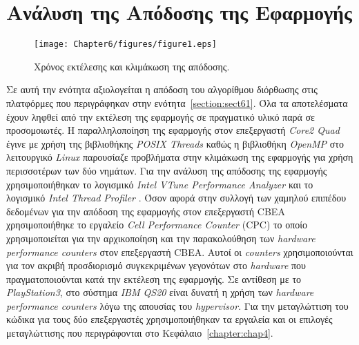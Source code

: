 \section{Ανάλυση της Απόδοσης της Εφαρμογής}
\label{section:sect62}
\begin{figure}
\centering
\texttt{[image: Chapter6/figures/figure1.eps]}
\caption{Χρόνος εκτέλεσης και κλιμάκωση της απόδοσης.}
\label{figure:fig61}
\end{figure}
\indent
Σε αυτή την ενότητα αξιολογείται η απόδοση του αλγορίθμου διόρθωσης στις πλατφόρμες που περιγράφηκαν στην ενότητα~\ref{section:sect61}. Όλα τα αποτελέσματα έχουν ληφθεί από την εκτέλεση της εφαρμογής σε πραγματικό υλικό παρά σε προσομοιωτές.\newline \indent
Η παραλληλοποίηση της εφαρμογής στον επεξεργαστή \textsl{Core2 Quad} έγινε με χρήση της βιβλιοθήκης \textsl{POSIX Threads} καθώς η βιβλιοθήκη \textsl{OpenMP} στο λειτουργικό \textsl{Linux} παρουσίαζε προβλήματα στην κλιμάκωση της εφαρμογής για χρήση περισσοτέρων των δύο νημάτων. Για την ανάλυση της απόδοσης της εφαρμογής χρησιμοποιήθηκαν το λογισμικό \textsl{Intel VTune Performance Analyzer} \cite{intelvtune} και το λογισμικό \textsl{Intel Thread Profiler} \cite{threadprofiler}.\newline \indent
Όσον αφορά στην συλλογή των χαμηλού επιπέδου δεδομένων για την απόδοση της εφαρμογής στον επεξεργαστή \ac{CBEA} χρησιμοποιήθηκε το εργαλείο \textsl{Cell Performance Counter} (CPC) το οποίο χρησιμοποιείται για την αρχικοποίηση και την παρακολούθηση των \textsl{hardware performance counters} στον επεξεργαστή \ac{CBEA}. Αυτοί οι \textsl{counters} χρησιμοποιούνται για τον ακριβή προσδιορισμό συγκεκριμένων γεγονότων στο \textsl{hardware} που πραγματοποιούνται κατά την εκτέλεση της εφαρμογής. Σε αντίθεση με το \textsl{PlayStation3}, στο σύστημα \textsl{IBM QS20} είναι δυνατή η χρήση των \textsl{hardware performance counters} λόγω της απουσίας του \textsl{hypervisor}.\newline \indent
Για την μεταγλώττιση του κώδικα για τους δύο επεξεργαστές χρησιμοποιήθηκαν τα εργαλεία και οι επιλογές μεταγλώττισης που περιγράφονται στο Κεφάλαιο~\ref{chapter:chap4}.


